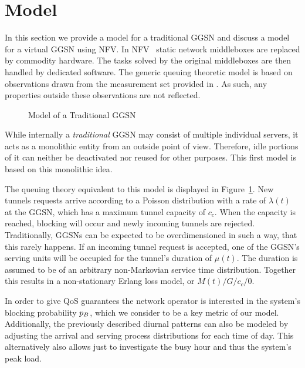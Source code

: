 \section{Model}
\label{sec:model}
In this section we provide a model for a traditional \gls{GGSN} and discuss a model for a virtual \gls{GGSN} using \gls{NFV}. In \gls{NFV}~\cite{nfv_whitepaper} static network middleboxes are replaced by commodity hardware. The tasks solved by the original middleboxes are then handled by dedicated software. The generic queuing theoretic model is based on observations drawn from the measurement set provided in . As such, any properties outside these observations are not reflected.

\begin{figure}[htbp]
  \centering
  \resizebox{0.8\columnwidth}{!}{}
  \caption{Model of a Traditional GGSN}
\label{fig:model_traditional_ggsn}
\end{figure}

While internally a \emph{traditional} \gls{GGSN} may consist of multiple individual servers, it acts as a monolithic entity from an outside point of view. Therefore, idle portions of it can neither be deactivated nor reused for other purposes. This first model is based on this monolithic idea.

The queuing theory equivalent to this model is displayed in Figure~\ref{fig:model_traditional_ggsn}. New tunnels requests arrive according to a Poisson distribution with a rate of $\lambda(t)$ at the GGSN, which has a maximum tunnel capacity of $c_c$. When the capacity is reached, blocking will occur and newly incoming tunnels are rejected. Traditionally, \glspl{GGSN} can be expected to be overdimensioned in such a way, that this rarely happens. If an incoming tunnel request is accepted, one of the \gls{GGSN}'s serving units will be occupied for the tunnel's duration of $\mu(t)$. The duration is assumed to be of an arbitrary non-Markovian service time distribution. Together this results in a non-stationary Erlang loss model, or $M(t)/G/c_c/0$.

In order to give QoS guarantees the network operator is interested in the system's blocking probability $p_B$, which we consider to be a key metric of our model.
Additionally, the previously described diurnal patterns can also be modeled by adjusting the arrival and serving process distributions for each time of day. This alternatively also allows just to investigate the busy hour and thus the system's peak load.

